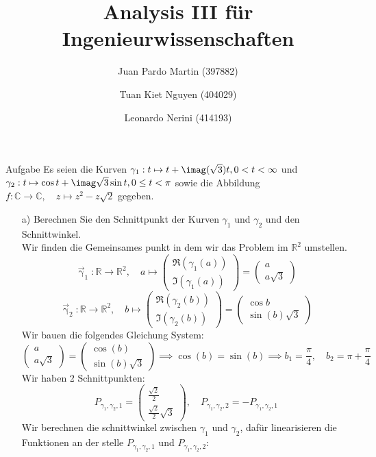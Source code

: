 \documentclass{scrartcl}
\title{Analysis III für Ingenieurwissenschaften}
\author{Juan Pardo Martin (397882)\and Tuan Kiet Nguyen (404029)\and Leonardo Nerini (414193)}
\def\mbb#1{\mathbb{#1}}
\def\bC{\mbb{C}}
\def\bR{\mbb{R}}
\newcommand{\func}[3]{#1\colon#2\to#3}
\newcommand{\vfunc}[5]{\func{#1}{#2}{#3},\quad#4\longmapsto#5}
\begin{document}
\maketitle
\begin{section}{Aufgabe}%
Es seien die Kurven \(\gamma_1 : t \mapsto t + \imag(\sqrt 3)t, 0 < t < \infty\) 
und 
\(\gamma_2 : t \mapsto \cos t + \imag\sqrt 3 \sin t, 0 \leq t < \pi\)
sowie die Abbildung \(\vfunc{f}{\bC}{\bC}{z}{z^2-z\sqrt 2}\)
 gegeben.
\begin{itemize}
\item[a)]
Berechnen Sie den Schnittpunkt der Kurven $\gamma_1$ und $\gamma_2$ und den Schnittwinkel.\\
Wir finden die Gemeinsames punkt in dem wir das Problem im $\bR^2$ umstellen.
\[\vfunc{\vec{\upgamma}_1}{\bR}{\bR^2}{a}{\begin{pmatrix}\Re(\gamma_1(a))\\\Im(\gamma_1(a))\end{pmatrix}
=\begin{pmatrix}a\\a\sqrt{3}\end{pmatrix}}\]
\[\vfunc{\vec{\upgamma}_2}{\bR}{\bR^2}{b}{\begin{pmatrix}\Re(\gamma_2(b))\\\Im(\gamma_2(b))\end{pmatrix}
=\begin{pmatrix}\cos b\\\sin(b)\sqrt{3}\end{pmatrix}}\]
Wir bauen die folgendes Gleichung System:
\[\begin{pmatrix}a\\a\sqrt{3}\end{pmatrix}=\begin{pmatrix}\cos(b)\\\sin(b)\sqrt{3}\end{pmatrix}\implies \cos(b)=\sin(b)\implies b_1=\frac{\pi}{4},\quad b_2=\pi+\frac{\pi}{4}\]
Wir haben 2 Schnittpunkten:
\newcommand{\schnt}[3]{P_{#1,#2,#3}}
\[\schnt{\gamma_1}{\gamma_2}{1}=\begin{pmatrix}\frac{\sqrt{2}}{2}\\\frac{\sqrt{2}}{2} \sqrt{3}\end{pmatrix},\quad \schnt{\gamma_1}{\gamma_2}{2}=-\schnt{\gamma_1}{\gamma_2}{1}\]
Wir berechnen die schnittwinkel zwischen $\gamma_1$ und $\gamma_2$, dafür linearisieren die Funktionen an der stelle $\schnt{\gamma_1}{\gamma_2}{1}$ und $\schnt{\gamma_1}{\gamma_2}{2}$:\\

\end{itemize}
\end{section}
\end{document}
